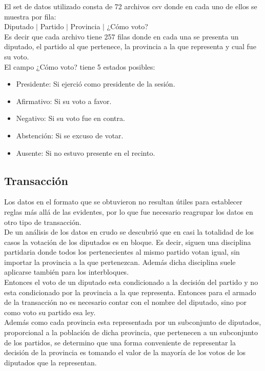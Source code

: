 \documentclass{endm}
\begin{document}
El set de datos utilizado consta de 72 archivos csv donde en cada uno de ellos se muestra por fila: \\

Diputado $|$ Partido $|$ Provincia $|$ ¿Cómo voto?\\

Es decir que cada archivo tiene 257 filas donde en cada una se presenta un diputado, el partido al que pertenece, la provincia a la que representa y cual fue su voto.\\

El campo ¿Cómo voto? tiene 5 estados posibles:\\

\begin{itemize}
\item Presidente: Si ejerció como presidente de la sesión.
\item Afirmativo: Si su voto a favor.
\item Negativo: Si su voto fue en contra.
\item Abstención: Si se excuso de votar.
\item Ausente: Si no estuvo presente en el recinto.
\end{itemize}

\subsection{Transacción}

Los datos en el formato que se obtuvieron no resultan útiles para establecer reglas más allá de las evidentes, por lo que fue necesario reagrupar los datos en otro tipo de transacción. \\

De un análisis de los datos en crudo se descubrió que en casi la totalidad de los casos la votación de los diputados es en bloque. Es decir, siguen una disciplina partidaria donde todos los pertenecientes al mismo partido votan igual, sin importar la provincia a la que pertenezcan. Además dicha disciplina suele aplicarse también para los interbloques. \\

Entonces el voto de un diputado esta condicionado a la decisión del partido y no esta condicionado por la provincia a la que representa. Entonces para el armado de la transacción no es necesario contar con el nombre del diputado, sino por como voto su partido esa ley. \\

Además como cada provincia esta representada por un subconjunto de diputados, proporcional a la población de dicha provincia, que pertenecen a un subconjunto de los partidos, se determino que una forma conveniente de representar la decisión de la provincia es tomando el valor de la mayoría de los votos de los diputados que la representan. \\
\end{document}
